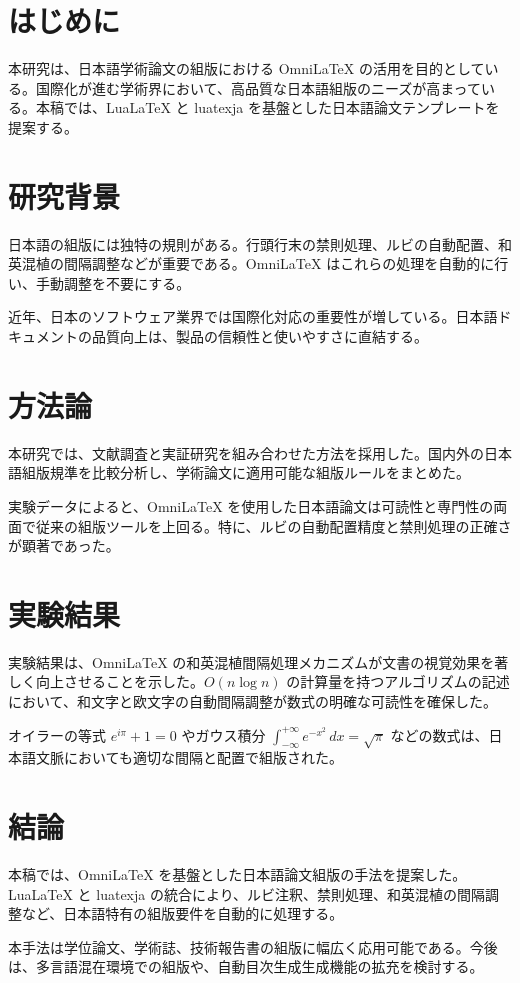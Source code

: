 \documentclass[
    language=japanese,
    doctype=thesis,
    institution=none,
    titlestyle=thesis,
]{../../omnilatex}
\begin{document}
\frontmatter
\maketitle
\tableofcontents

\mainmatter
\chapter{はじめに}
本研究は、日本語学術論文の組版における OmniLaTeX の活用を目的としている。国際化が進む学術界において、高品質な日本語組版のニーズが高まっている。本稿では、LuaLaTeX と luatexja を基盤とした日本語論文テンプレートを提案する。

\chapter{研究背景}
日本語の組版には独特の規則がある。行頭行末の禁則処理、ルビの自動配置、和英混植の間隔調整などが重要である。OmniLaTeX はこれらの処理を自動的に行い、手動調整を不要にする。

近年、日本のソフトウェア業界では国際化対応の重要性が増している。日本語ドキュメントの品質向上は、製品の信頼性と使いやすさに直結する。

\chapter{方法論}
本研究では、文献調査と実証研究を組み合わせた方法を採用した。国内外の日本語組版規準を比較分析し、学術論文に適用可能な組版ルールをまとめた。

実験データによると、OmniLaTeX を使用した日本語論文は可読性と専門性の両面で従来の組版ツールを上回る。特に、ルビの自動配置精度と禁則処理の正確さが顕著であった。

\chapter{実験結果}
実験結果は、OmniLaTeX の和英混植間隔処理メカニズムが文書の視覚効果を著しく向上させることを示した。$O(n \log n)$ の計算量を持つアルゴリズムの記述において、和文字と欧文字の自動間隔調整が数式の明確な可読性を確保した。

オイラーの等式 $e^{i\pi} + 1 = 0$ やガウス積分 $\int_{-\infty}^{+\infty} e^{-x^2} \, dx = \sqrt{\pi}$ などの数式は、日本語文脈においても適切な間隔と配置で組版された。

\chapter{結論}
本稿では、OmniLaTeX を基盤とした日本語論文組版の手法を提案した。LuaLaTeX と luatexja の統合により、ルビ注釈、禁則処理、和英混植の間隔調整など、日本語特有の組版要件を自動的に処理する。

本手法は学位論文、学術誌、技術報告書の組版に幅広く応用可能である。今後は、多言語混在環境での組版や、自動目次生成生成機能の拡充を検討する。

\backmatter
\printbibliography
\end{document}

